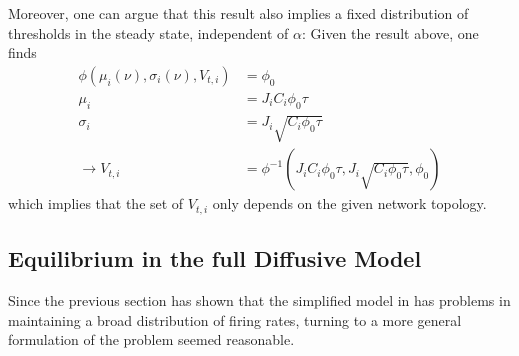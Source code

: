 \documentclass[10pt,a4paper]{article}
\begin{document}
Moreover, one can argue that this result also implies a fixed distribution of thresholds in the steady state, independent of $\alpha$: Given the result above, one finds
\begin{align}
\phi(\mu_i(\nu),\sigma_i(\nu),V_{t,i}) &= \phi_0 \label{fixed_thresh_dist_argument1} \\
\mu_i &= J_iC_i \phi_0 \tau \label{fixed_thresh_dist_argument2} \\
\sigma_i &= J_i\sqrt{C_i \phi_0  \tau} \label{fixed_thresh_dist_argument3} \\
\rightarrow V_{t,i} &= {\phi}^{-1}(J_iC_i \phi_0 \tau,J_i\sqrt{C_i \phi_0  \tau},\phi_0) \label{fixed_thresh_dist_argument4}
\end{align}
which implies that the set of $V_{t,i}$ only depends on the given network topology.

\subsection{Equilibrium in the full Diffusive Model} \label{Matrix_Diff_Model_Section}
Since the previous section has shown that the simplified model in \cite{Sweeney_Paper} has problems in maintaining a broad distribution of firing rates, turning to a more general formulation of the problem seemed reasonable.
\end{document}
